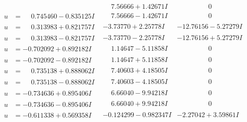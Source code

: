 \documentclass[1p]{elsarticle_modified}
\theoremstyle{definition}
\begin{document}
$$\begin{array}{c|c|c}
 & \phantom{-}7.56666 + 1.42671 I & \phantom{-0.000000 } 0 \\ \hline\begin{aligned}
u &= \phantom{-}0.745460 - 0.835125 I\end{aligned}
 & \phantom{-}7.56666 - 1.42671 I & \phantom{-0.000000 } 0 \\ \hline\begin{aligned}
u &= \phantom{-}0.313983 + 0.821757 I\end{aligned}
 & -3.73770 + 2.25778 I & -12.76156 - 5.27279 I \\ \hline\begin{aligned}
u &= \phantom{-}0.313983 - 0.821757 I\end{aligned}
 & -3.73770 - 2.25778 I & -12.76156 + 5.27279 I \\ \hline\begin{aligned}
u &= -0.702092 + 0.892182 I\end{aligned}
 & \phantom{-}1.14647 - 5.11858 I & \phantom{-0.000000 } 0 \\ \hline\begin{aligned}
u &= -0.702092 - 0.892182 I\end{aligned}
 & \phantom{-}1.14647 + 5.11858 I & \phantom{-0.000000 } 0 \\ \hline\begin{aligned}
u &= \phantom{-}0.735138 + 0.888062 I\end{aligned}
 & \phantom{-}7.40603 + 4.18505 I & \phantom{-0.000000 } 0 \\ \hline\begin{aligned}
u &= \phantom{-}0.735138 - 0.888062 I\end{aligned}
 & \phantom{-}7.40603 - 4.18505 I & \phantom{-0.000000 } 0 \\ \hline\begin{aligned}
u &= -0.734636 + 0.895406 I\end{aligned}
 & \phantom{-}6.66040 - 9.94218 I & \phantom{-0.000000 } 0 \\ \hline\begin{aligned}
u &= -0.734636 - 0.895406 I\end{aligned}
 & \phantom{-}6.66040 + 9.94218 I & \phantom{-0.000000 } 0 \\ \hline\begin{aligned}
u &= -0.611338 + 0.569358 I\end{aligned}
 & -0.124299 - 0.982347 I & -2.27042 + 3.59861 I \\ \hline\begin{aligned}

\end{aligned}
\end{array}$$
\end{document}
